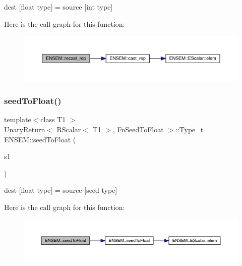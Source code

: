 dest \mbox{[}float type\mbox{]} = source \mbox{[}int type\mbox{]} 

Here is the call graph for this function\+:\nopagebreak
\begin{figure}[H]
\begin{center}
\leavevmode
\includegraphics[width=350pt]{d9/ded/group__rscalar_ga1ecb21d4e8fc1e664055d3fa1145f6e9_cgraph}
\end{center}
\end{figure}
\mbox{\label{group__rscalar_gaaeb1321ab6946f99106e2a50f9098353}} 
\subsubsection{\texorpdfstring{seedToFloat()}{seedToFloat()}}
{\footnotesize\ttfamily template$<$class T1 $>$ \\
\mbox{\hyperlink{structENSEM_1_1UnaryReturn}{Unary\+Return}}$<$ \mbox{\hyperlink{classENSEM_1_1RScalar}{R\+Scalar}}$<$ T1 $>$, \mbox{\hyperlink{structENSEM_1_1FnSeedToFloat}{Fn\+Seed\+To\+Float}} $>$\+::Type\+\_\+t E\+N\+S\+E\+M\+::seed\+To\+Float (\begin{DoxyParamCaption}\item[{const \mbox{\hyperlink{classENSEM_1_1RScalar}{R\+Scalar}}$<$ T1 $>$ \&}]{s1 }\end{DoxyParamCaption})\hspace{0.3cm}{\ttfamily [inline]}}



dest \mbox{[}float type\mbox{]} = source \mbox{[}seed type\mbox{]} 

Here is the call graph for this function\+:\nopagebreak
\begin{figure}[H]
\begin{center}
\leavevmode
\includegraphics[width=350pt]{d9/ded/group__rscalar_gaaeb1321ab6946f99106e2a50f9098353_cgraph}
\end{center}
\end{figure}
\mbox{\label{group__rscalar_ga60f574c6e8f0da11360b8c41c46490a5}} 
